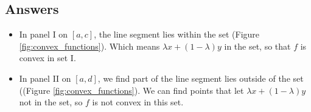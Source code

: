 \documentclass{article}
\begin{document}
\begin{sloppypar}
\begin{aprob}
    \subsection*{Answers}
    \begin{itemize}
        \item In panel I on $[a, c]$, the line segment lies within the set (Figure \ref{fig:convex_functions}). 
        Which means $\lambda x + (1-\lambda) y$ in the set, so that $f$ is convex in set I.
        \item In panel II on $[a, d]$, we find part of the line segment lies outside of the set ((Figure \ref{fig:convex_functions}). 
        We can find points that let $\lambda x + (1-\lambda) y$ not in the set, so $f$ is not convex in this set.
    \end{itemize}
\end{aprob}

\newpage



\end{sloppypar}
\end{document}
